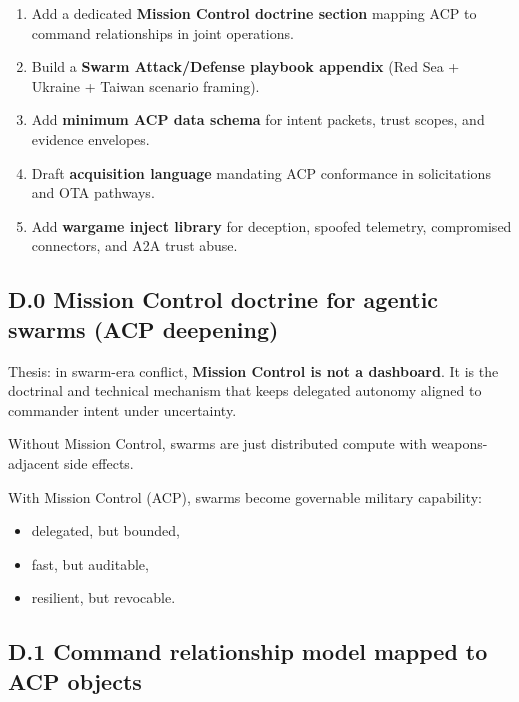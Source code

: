 \documentclass[
]{article}
\providecommand{\tightlist}{%
  \setlength{\itemsep}{0pt}\setlength{\parskip}{0pt}}
\begin{document}
\begin{enumerate}
\def\labelenumi{\arabic{enumi}.}
\tightlist
\item
  Add a dedicated \textbf{Mission Control doctrine section} mapping ACP
  to command relationships in joint operations.
\item
  Build a \textbf{Swarm Attack/Defense playbook appendix} (Red Sea +
  Ukraine + Taiwan scenario framing).
\item
  Add \textbf{minimum ACP data schema} for intent packets, trust scopes,
  and evidence envelopes.
\item
  Draft \textbf{acquisition language} mandating ACP conformance in
  solicitations and OTA pathways.
\item
  Add \textbf{wargame inject library} for deception, spoofed telemetry,
  compromised connectors, and A2A trust abuse.
\end{enumerate}

\hypertarget{d.0-mission-control-doctrine-for-agentic-swarms-acp-deepening}{%
\subsection{D.0 Mission Control doctrine for agentic swarms (ACP
deepening)}\label{d.0-mission-control-doctrine-for-agentic-swarms-acp-deepening}}

Thesis: in swarm-era conflict, \textbf{Mission Control is not a
dashboard}. It is the doctrinal and technical mechanism that keeps
delegated autonomy aligned to commander intent under uncertainty.

Without Mission Control, swarms are just distributed compute with
weapons-adjacent side effects.

With Mission Control (ACP), swarms become governable military
capability:

\begin{itemize}
\tightlist
\item
  delegated, but bounded,
\item
  fast, but auditable,
\item
  resilient, but revocable.
\end{itemize}

\hypertarget{d.1-command-relationship-model-mapped-to-acp-objects}{%
\subsection{D.1 Command relationship model mapped to ACP
objects}\label{d.1-command-relationship-model-mapped-to-acp-objects}}
\end{document}
